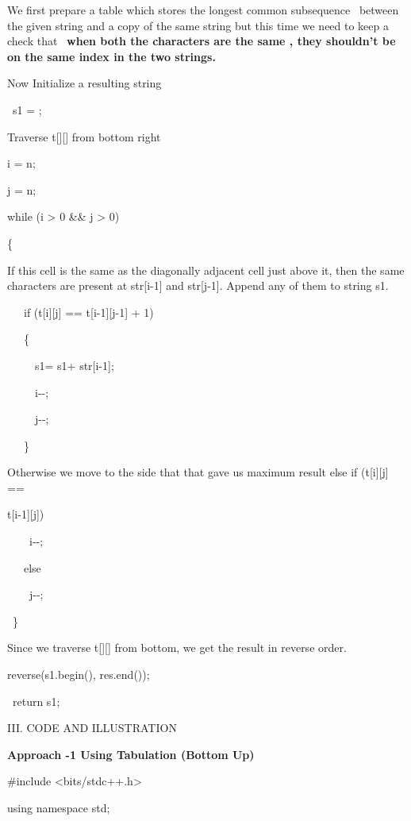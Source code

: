 \documentclass[letterpaper]{article}
\begin{document}
\begin{multicols}{2}
We first prepare a table which stores the longest common subsequence \ between the given string and a copy of the same
string but this time we need to keep a check that \ \textbf{when both the characters are the same , they shouldn't be
on the same index in the two strings. }

Now Initialize a resulting string

\ s1 = {\textquotedbl}{\textquotedbl};

Traverse t[][] from bottom right

i = n;

j = n;

while (i {\textgreater} 0 \&\& j {\textgreater} 0)

\{

If this cell is the same as the diagonally adjacent cell just above it, then the same characters are present at str[i-1]
and str[j-1]. Append any of them to string s1.

\ \ \ if (t[i][j] == t[i-1][j-1] + 1)

\ \ \ \{

\ \ \ \ \ s1= s1+ str[i-1];

\ \ \ \ \ i-{}-;

\ \ \ \ \ j-{}-;

\ \ \ \}

Otherwise we move to the side that that gave us maximum result else if (t[i][j] ==

t[i-1][j])

\ \ \ \ i-{}-;

\ \ \ else

\ \ \ \ j-{}-;

\ \}

Since we traverse t[][] from bottom, we get the result in reverse order.

reverse(s1.begin(), res.end());

\ return s1;


\bigskip


\bigskip


\bigskip

III. CODE AND ILLUSTRATION

{\bfseries
Approach -1 Using Tabulation (Bottom Up)}


\bigskip

{\color[rgb]{0.2509804,0.25882354,0.30588236}
\#include {\textless}bits/stdc++.h{\textgreater}}

{\color[rgb]{0.2509804,0.25882354,0.30588236}
using namespace std;}


\bigskip


\end{multicols}
\end{document}
